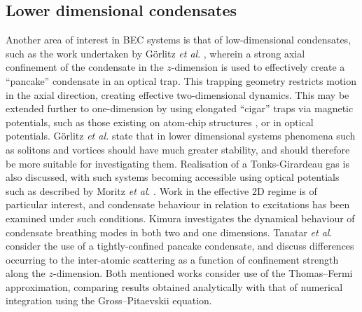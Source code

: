 \subsection{Lower dimensional condensates}\label{sub:coldatom_recent}
Another area of interest in BEC systems is that of low-dimensional condensates, such as the work undertaken by G\"{o}rlitz \textit{et al}. \cite{BEC:Gorlitz_prl_2001}, wherein a strong axial confinement of the
condensate in the $z$-dimension is used to effectively create a ``pancake'' condensate in an optical trap. This trapping geometry restricts motion in the axial direction, creating effective two-dimensional dynamics. This may be extended further to one-dimension by using elongated ``cigar'' traps via magnetic potentials, such as those existing on atom-chip structures \cite{AO:Denschlag_prl_1999,AO:Folman_prl_2000,AO:Haase_pra_2001}, or in optical potentials. G\"{o}rlitz \textit{et al.} state that in lower dimensional systems phenomena such as solitons and vortices should have much greater stability, and should therefore be more suitable for investigating them. Realisation of a Tonks-Girardeau gas is also discussed, with such systems becoming accessible using optical potentials such as described by Moritz \textit{et al}. \cite{OL:Moritz_prl_2003}. Work in the effective 2D regime is of particular interest, and condensate behaviour in relation to excitations has been examined under such conditions. Kimura \cite{BEC:Kimura_pra_2002} investigates the dynamical behaviour of condensate breathing modes in both two and one dimensions. Tanatar \textit{et al}. \cite{BEC:Tanatar_arxiv_2002} consider the use of a tightly-confined pancake condensate, and discuss differences occurring to the inter-atomic scattering as a function of confinement strength along the $z$-dimension. Both mentioned works consider use of the Thomas--Fermi approximation, comparing results obtained analytically with that of numerical integration using the Gross--Pitaevskii equation.

